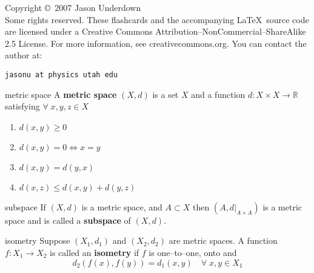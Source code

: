 \documentclass[avery5371,grid]{flashcards}
\newcommand{\R}{\mathbb{R}}
\begin{document}
\begin{flashcard}{Copyright \copyright \,
2007 Jason Underdown \\ Some rights reserved.}
These flashcards and the accompanying \LaTeX \, source code are licensed
under a Creative Commons Attribution--NonCommercial--ShareAlike 2.5 License.  
For more information, see creativecommons.org.  You can contact the author at:
\begin{center}
\begin{small}\tt jasonu at physics utah edu\end{small}
\end{center}
\end{flashcard}

\begin{flashcard}[Definition]{metric space}
A \textbf{metric space} $(X,d)$ is a set $X$ and a function
\mbox{$d: X \times X \rightarrow \R$} satisfying $\forall \; x,y,z \in X$
\begin{enumerate}
 \item $d(x,y) \geq 0$
 \item $d(x,y) = 0 \Leftrightarrow x=y$
 \item $d(x,y) = d(y,x)$
 \item $d(x,z) \leq d(x,y) + d(y,z)$
\end{enumerate}
\end{flashcard}

\begin{flashcard}[Definition]{subspace}
If $(X,d)$ is a metric space, and $A \subset X$ then
$(A,d|_{A \times A})$ is a metric space and is called
a \mbox{\textbf{subspace}} of $(X,d)$.
\end{flashcard}

\begin{flashcard}[Definition]{isometry}
Suppose $(X_1,d_1)$ and $(X_2,d_2)$ are metric spaces.  A function
$f: X_1 \rightarrow X_2$ is called an \mbox{\textbf{isometry}} if 
$f$ is one--to--one, onto and
\begin{equation*}
d_2(f(x),f(y)) = d_1(x,y) \quad \forall \; x,y \in X_1
\end{equation*}
\end{flashcard}
\end{document}
